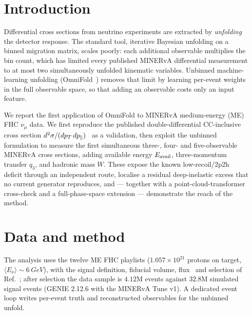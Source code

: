 
\section{Introduction}
Differential cross sections from neutrino experiments are extracted by
\emph{unfolding} the detector response. The standard tool, iterative Bayesian
unfolding on a binned migration matrix, scales poorly: each additional observable
multiplies the bin count, which has limited every published MINERvA differential
measurement to at most two simultaneously unfolded kinematic variables. Unbinned
machine-learning unfolding (OmniFold~\cite{Andreassen:2019cjw,Andreassen:2021zzk})
removes that limit by learning per-event weights in the full observable space, so
that adding an observable costs only an input feature.

We report the first application of OmniFold to MINERvA medium-energy (ME) FHC
$\nu_\mu$ data. We first reproduce the published double-differential
CC-inclusive cross section $d^{2}\sigma/(dp_{T}\,dp_{\parallel})$~\cite{MINERvA:2021owq} as
a validation, then exploit the unbinned formulation to measure the first
simultaneous three-, four- and five-observable MINERvA cross sections, adding
available energy $E_{\mathrm{avail}}$, three-momentum transfer $q_{3}$, and hadronic mass
$W$. These expose the known low-recoil/2p2h deficit through an independent route,
localise a residual deep-inelastic excess that no current generator reproduces,
and --- together with a point-cloud-transformer cross-check and a
full-phase-space extension --- demonstrate the reach of the method.

\section{Data and method}
The analysis uses the twelve ME FHC playlists ($1.057\times10^{21}$ protons on
target, $\langle E_\nu\rangle\sim\SI{6}{GeV}$), with the signal definition,
fiducial volume, flux~\cite{MINERvA:2016iqn} and selection of
Ref.~\cite{MINERvA:2021owq}; after selection the data sample is $4.12$M events
against $32.8$M simulated signal events (GENIE 2.12.6 with the MINERvA Tune v1).
A dedicated event loop writes per-event truth and reconstructed observables for
the unbinned unfold.

